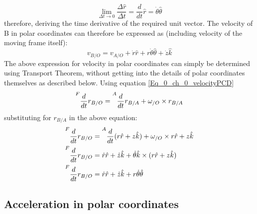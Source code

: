 \begin{equation}
	\lim_{\Delta t\to 0} \frac{\Delta \hat{r}}{\Delta t} = \frac{d}{dt}\hat{r} = \dot{\theta} \hat{\theta}
\end{equation}
therefore, deriving the time derivative of the required unit vector. The velocity of B in polar coordinates can therefore be expressed as (including velocity of the moving frame itself):
\begin{equation}
	v_{B/O} = v_{A/O} + \dot{r}\hat{r} + r \dot{\theta} \hat{\theta} + \dot{z}\hat{k}
\end{equation}
The above expression for velocity in polar coordinates can simply be determined using Transport Theorem, without getting into the details of polar coordinates themselves as described below. Using equation \eqref{Eq_0_ch_0_velocityPCD}
\begin{equation}
	\prescript{F}{}{\frac{d}{dt}r_{B/O}} = \prescript{A}{}{\frac{d}{dt}r_{B/A}} + \omega_{/O} \times r_{B/A}
\end{equation}
substituting for $r_{B/A}$ in the above equation:
\begin{align*}
	\prescript{F}{}{\frac{d}{dt}r_{B/O}} &= \prescript{A}{}{\frac{d}{dt}}(r \hat{r} + z \hat{k}) + \omega_{/O} \times r \hat{r} + z \hat{k} \\
	\prescript{F}{}{\frac{d}{dt}r_{B/O}} &= \dot{r}\hat{r} + \dot{z}\hat{k} + \dot{\theta}\hat{k} \times (r \hat{r} + z \hat{k}) \\
	\prescript{F}{}{\frac{d}{dt}r_{B/O}} &= \dot{r}\hat{r} + \dot{z}\hat{k} + r \dot{\theta} \hat{\theta}
\end{align*}

\subsection{Acceleration in polar coordinates}

